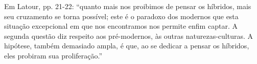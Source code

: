 Em Latour, pp. 21-22: \enquote{quanto mais nos proibimos de pensar os híbridos, mais seu cruzamento se torna possível; este é o paradoxo dos modernos que esta situação excepcional em que nos encontramos nos permite enfim captar. A segunda questão diz respeito aos pré-modernos, às outras naturezas-culturas. A hipótese, também demasiado ampla, é que, ao se dedicar a pensar os híbridos, eles probiram sua proliferação.}
